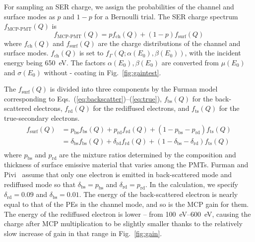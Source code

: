 For sampling an SER charge, we assign the probabilities of the channel and surface
modes as $p$ and $1-p$ for a Bernoulli trial. The SER charge spectrum $f_{\text{MCP-PMT}}(Q)$ is
\begin{equation}
	\label{eq:convolution}
	f_{\text{MCP-PMT}}(Q) = p f_{\mathrm{ch}}(Q)+(1-p) f_{\mathrm{surf}}(Q)
\end{equation}
where $f_{\mathrm{ch}}(Q)$ and $f_{\mathrm{surf}}(Q)$ are the charge distributions of the channel and surface modes.
$f_{\mathrm{ch}}(Q)$ is set to \(f_\Gamma(Q; \alpha(E_0), \beta(E_0))\), with the incident energy being \SI{650}{eV}.
The factors \(\alpha(E_0), \beta(E_0)\) are converted from $\mu(E_0)$ and $\sigma(E_0)$ without - coating in Fig.~\ref{fig:gaintest}.

The \(f_{\mathrm{surf}}(Q)\) is divided into three components by the Furman model
corresponding to Eqs.~(\ref{eq:backscatter})--(\ref{eq:true}),
$f_{\mathrm{bs}}(Q)$ for the back-scattered electrons,
$f_{\mathrm{rd}}(Q)$ for the rediffused electrons,
and $f_{\mathrm{ts}}(Q)$ for the true-secondary electrons.
\begin{equation}
	\label{eq:surface_3}
	\begin{aligned}
		f_{\mathrm{surf}}(Q) & = p_{\mathrm{bs}} f_{\mathrm{bs}}(Q) + p_{\mathrm{rd}} f_{\mathrm{rd}}(Q) + (1- p_{\mathrm{bs}} - p_{\mathrm{rd}}) f_{\mathrm{ts}}(Q)                     \\
		                     & = \delta_{\mathrm{bs}} f_{\mathrm{bs}}(Q) + \delta_{\mathrm{rd}} f_{\mathrm{rd}}(Q) + (1- \delta_{\mathrm{bs}} - \delta_{\mathrm{rd}}) f_{\mathrm{ts}}(Q) \\
	\end{aligned}
\end{equation}
where $p_{\mathrm{bs}}$ and $p_{\mathrm{rd}}$ are the mixture ratios
determined by the composition and thickness of surface emissive material
that varies among the PMTs.  Furman and Pivi~\cite{2002Probabilistic} assume that
only one electron is emitted in back-scattered mode and rediffused mode
so that \(\delta_{\mathrm{bs}} = p_{\mathrm{bs}}\) and \(\delta_{\mathrm{rd}} = p_{\mathrm{rd}}\).
In the calculation, we specify $\delta_{\mathrm{rd}}=0.09$ and $\delta_{\mathrm{bs}}=0.01$.
The energy of the back-scattered electron is nearly equal to that of the PEs in the channel mode,
and so is the MCP gain for them.
The energy of the rediffused electron
is lower -- from \SIrange{100}{600}{eV}, causing the charge after MCP multiplication
to be slightly smaller thanks to the relatively slow increase of gain in that range in Fig.~\ref{fig:gain}.
